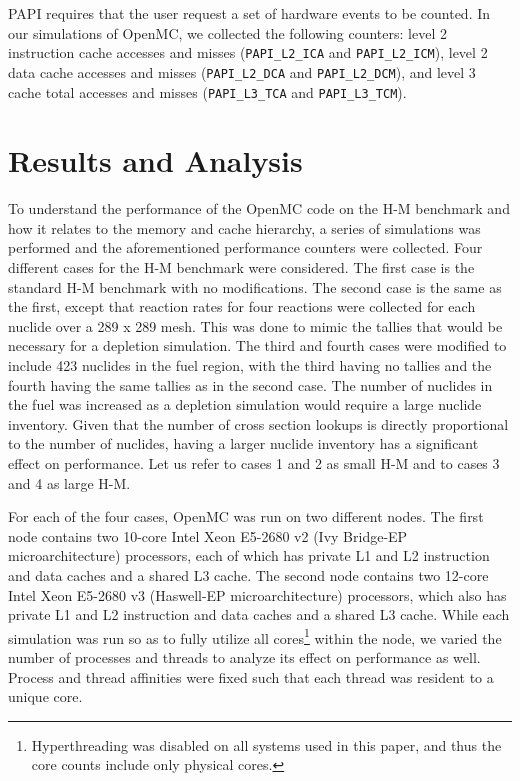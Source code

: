 \documentclass{mc2015}
\begin{document}
PAPI requires that the user request a set of hardware events to be counted. In
our simulations of OpenMC, we collected the following counters: level 2
instruction cache accesses and misses (\texttt{PAPI\_L2\_ICA} and
\texttt{PAPI\_L2\_ICM}), level 2 data cache accesses and misses
(\texttt{PAPI\_L2\_DCA} and \texttt{PAPI\_L2\_DCM}), and level 3 cache total
accesses and misses (\texttt{PAPI\_L3\_TCA} and \linebreak \texttt{PAPI\_L3\_TCM}).

\section{Results and Analysis}

To understand the performance of the OpenMC code on the H-M benchmark and how
it relates to the memory and cache hierarchy, a series of simulations was
performed and the aforementioned performance counters were collected. Four
different cases for the H-M benchmark were considered. The first case is the
standard H-M benchmark with no modifications. The second case is the same as
the first, except that reaction rates for four reactions were collected for
each nuclide over a 289 x 289 mesh. This was done to mimic the tallies that
would be necessary for a depletion simulation. The third and fourth cases were
modified to include 423 nuclides in the fuel region, with the third having no
tallies and the fourth having the same tallies as in the second case. The
number of nuclides in the fuel was increased as a depletion simulation would
require a large nuclide inventory. Given that the number of cross section
lookups is directly proportional to the number of nuclides, having a larger
nuclide inventory has a significant effect on performance. Let us refer to
cases 1 and 2 as small H-M and to cases 3 and 4 as large H-M.

For each of the four cases, OpenMC was run on two different nodes. The first
node contains two 10-core Intel Xeon E5-2680 v2 (Ivy Bridge-EP
microarchitecture) processors, each of which has private L1 and L2 instruction
and data caches and a shared L3 cache. The second node contains two 12-core
Intel Xeon E5-2680 v3 (Haswell-EP microarchitecture) processors, which also has
private L1 and L2 instruction and data caches and a shared L3 cache. While each
simulation was run so as to fully utilize all cores\footnote{Hyperthreading was
  disabled on all systems used in this paper, and thus the core counts include
  only physical cores.} within the node, we varied the number of processes and
threads to analyze its effect on performance as well. Process and thread
affinities were fixed such that each thread was resident to a unique core.
\end{document}
